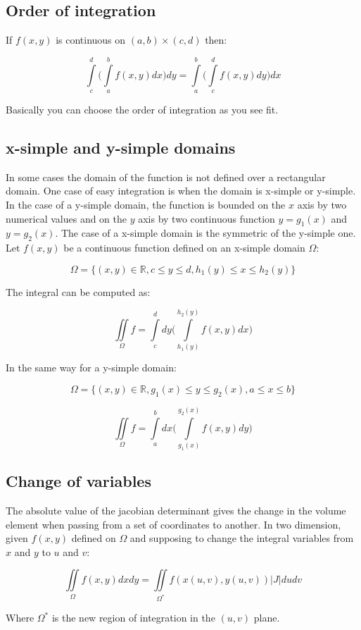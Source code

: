 	\subsection{Order of integration}
	If $f(x,y)$ is continuous on $(a,b)\times (c,d)$ then:

	$$\int\limits_c^d\biggl(\int\limits_a^b f(x,y)dx\biggr)dy = \int\limits_a^b\biggl(\int\limits_c^d f(x,y)dy\biggr)dx$$

	Basically you can choose the order of integration as you see fit.

	\subsection{x-simple and y-simple domains}
	In some cases the domain of the function is not defined over a rectangular domain.
	One case of easy integration is when the domain is x-simple or y-simple.
	In the case of a y-simple domain, the function is bounded on the $x$ axis by two numerical values and on the $y$ axis by two continuous function $y = g_1(x)$ and $y = g_2(x)$.
	The case of a x-simple domain is the symmetric of the y-simple one.
	Let $f(x,y)$ be a continuous function defined on an x-simple domain $\Omega$:

	$$\Omega = \{(x,y)\in\mathbb{R}, c\le y\le d, h_1(y)\le x\le h_2(y)\}$$

	The integral can be computed as:

	$$\iint\limits_{\Omega} f = \int\limits_c^ddy\biggl(\int\limits_{h_1(y)}^{h_2(y)}f(x,y)dx\biggr)$$

	In the same way for a y-simple domain:

	$$\Omega = \{(x,y)\in\mathbb{R}, g_1(x)\le y\le g_2(x), a\le x\le b\}$$

	$$\iint\limits_\Omega f = \int\limits_a^bdx\biggl(\int\limits_{g_1(x)}^{g_2(x)}f(x,y)dy\biggr)$$

	\subsection{Change of variables}
	The absolute value of the jacobian determinant gives the change in the volume element when passing from a set of coordinates to another.
	In two dimension, given $f(x,y)$ defined on $\Omega$ and supposing to change the integral variables from $x$ and $y$ to $u$ and $v$:

	$$\iint\limits_\Omega f(x,y)dxdy = \iint\limits_{\Omega^*} f(x(u,v), y(u,v))|J|dudv$$

	Where $\Omega^*$ is the new region of integration in the $(u,v)$ plane.
